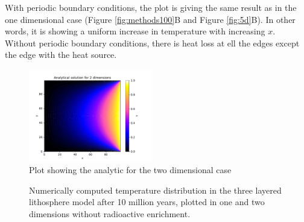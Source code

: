 \documentclass[10pt,a4paper]{article}
\begin{document}
\noindent With periodic boundary conditions, the plot is giving the same result as in the one dimensional case (Figure \ref{fig:methods100}B and Figure \ref{fig:5d}B). In other words, it is showing a uniform increase in temperature with increasing $x$. Without periodic boundary conditions, there is heat loss at ell the edges except the edge with the heat source. 

\begin{figure} [H]
	\centering
	\includegraphics[width=0.48\textwidth]{../plots/2Danal.pdf}
	\caption{\label{fig:2danal} Plot showing the analytic for the two dimensional case}
\end{figure}




\begin{figure} [H]
	\centering
	\caption{\label{10notenriched}Numerically computed temperature distribution in the three layered lithosphere model after 10 million years, plotted in one and two dimensions without radioactive enrichment. }
\end{figure}
\end{document}
